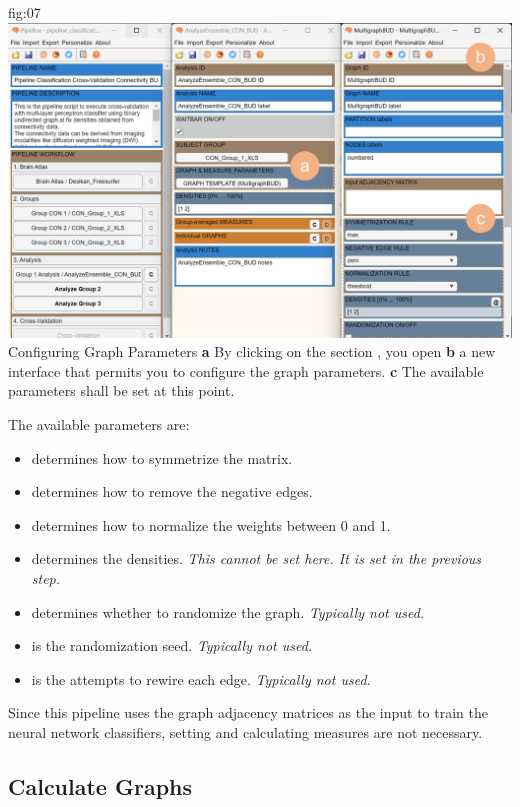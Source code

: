 \documentclass[justified]{tufte-handout}
\begin{document}
{
	{fig:07}
	{
	\includegraphics{fig07.jpg}
	}
	{Configuring Graph Parameters}
	{
	{\bf a} By clicking on the section , you open {\bf b} a new interface that permits you to configure the graph parameters.
	{\bf c} The available parameters shall be set at this point.
	}

The available parameters are:
\begin{itemize}
	\item {} determines how to symmetrize the matrix.
	\item {} determines how to remove the negative edges.
	\item {} determines how to normalize the weights between 0 and 1.
	\item {} determines the densities. \emph{This cannot be set here. It is set in the previous step.}
	\item {} determines whether to randomize the graph. \emph{Typically not used.}
	\item {} is the randomization seed. \emph{Typically not used.}
	\item {} is the attempts to rewire each edge. \emph{Typically not used.}
\end{itemize}

Since this pipeline uses the graph adjacency matrices as the input to train the neural network classifiers, setting and calculating measures are not necessary.

\subsection{Calculate Graphs}
 
}
\end{document}

